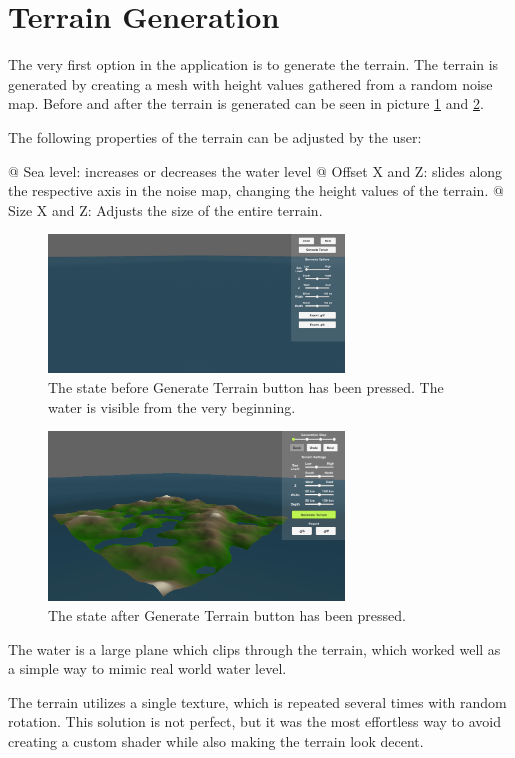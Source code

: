 \section{Terrain Generation}

The very first option in the application is to generate the terrain.
The terrain is generated by creating a mesh with height values gathered from a random noise map.
Before and after the terrain is generated can be seen in picture \ref{fig:no_terr} and \ref{fig:terr}.

The following properties of the terrain can be adjusted by the user:

\begin{easylist}
 @ Sea level: increases or decreases the water level
 @ Offset X and Z: slides along the respective axis in the noise map, changing the height values of the terrain.
 @ Size X and Z: Adjusts the size of the entire terrain.
\end{easylist}

\begin{figure}[H]
  \centering

  \includegraphics[width=0.7\textwidth]{figure/terrain_not_generated.png}
  \caption{The state before Generate Terrain button has been pressed. The water is visible from the very beginning.}

  \label{fig:no_terr}
\end{figure}

\begin{figure}[H]
  \centering

  \includegraphics[width=0.7\textwidth]{figure/terrain_generated.png}
  \caption{The state after Generate Terrain button has been pressed.}

  \label{fig:terr}
\end{figure}

 
The water is a large plane which clips through the terrain, which worked well as a simple way to mimic real world water level.

The terrain utilizes a single texture, which is repeated several times with random rotation.
This solution is not perfect, but it was the most effortless way to avoid creating a custom shader while also making the terrain look decent.
